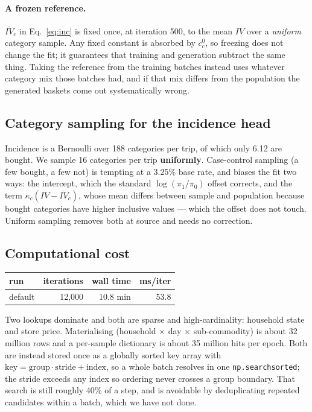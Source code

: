 \documentclass[11pt]{article}
\newcommand{\code}[1]{\texttt{#1}}
\begin{document}
\paragraph{A frozen reference.} $\overline{IV}_c$ in Eq.~\ref{eq:inc} is fixed once, at
iteration 500, to the mean $IV$ over a \emph{uniform} category sample. Any fixed
constant is absorbed by $c^0_c$, so freezing does not change the fit; it guarantees that
training and generation subtract the same thing. Taking the reference from the training
batches instead uses whatever category mix those batches had, and if that mix differs
from the population the generated baskets come out systematically wrong.

\subsection{Category sampling for the incidence head}

Incidence is a Bernoulli over 188 categories per trip, of which only 6.12 are
bought. We sample 16 categories per trip \textbf{uniformly}. Case-control sampling
(a few bought, a few not) is tempting at a 3.25\% base rate, and biases the fit two
ways: the intercept, which the standard $\log(\pi_1/\pi_0)$ offset corrects, and the term
$\kappa_c(IV-\overline{IV}_c)$, whose mean differs between sample and population because
bought categories have higher inclusive values --- which the offset does not touch.
Uniform sampling removes both at source and needs no correction.

\subsection{Computational cost}

\begin{center}
\begin{tabular}{lrrr}
\toprule
run & iterations & wall time & ms/iter \\
\midrule
default & 12,000 & 10.8 min & 53.8 \\
\bottomrule
\end{tabular}
\end{center}

Two lookups dominate and both are sparse and high-cardinality: household state and
store price. Materialising (household $\times$ day $\times$ sub-commodity) is about 32
million rows and a per-sample dictionary is about 35 million hits per epoch. Both are
instead stored once as a globally sorted key array with
$\mathrm{key}=\mathrm{group}\cdot\mathrm{stride}+\mathrm{index}$, so a whole batch
resolves in one \code{np.searchsorted}; the stride exceeds any index so ordering never
crosses a group boundary. That search is still roughly 40\% of a step, and is avoidable
by deduplicating repeated candidates within a batch, which we have not done.
\end{document}
